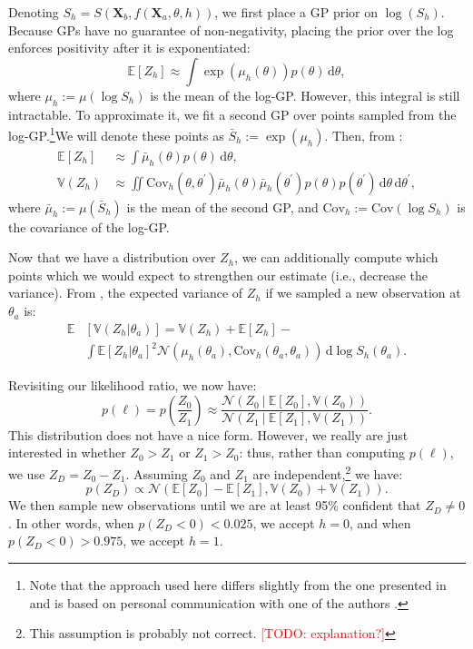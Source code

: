 \documentclass[10pt,letterpaper]{article}
\newcommand{\TODO}[1]{\textcolor{red}{[TODO: #1]}}
\newcommand{\Xa}[0]{\mathbf{X}_a}
\newcommand{\Xb}[0]{\mathbf{X}_b}
\newcommand{\dif}[0]{\,\mathrm{d}}
\begin{document}
Denoting $S_h=S(\Xb, f(\Xa, \theta, h))$, we first place a GP prior on
$\log(S_h)$. Because GPs have no guarantee of non-negativity, placing
the prior over the log enforces positivity after it is exponentiated:
\begin{equation}
\mathbb{E}[Z_h] \approx \int \exp(\mu_h(\theta))p(\theta)\dif\theta,
\end{equation}
where $\mu_h:=\mu(\log S_h)$ is the mean of the log-GP. However, this
integral is still intractable. To approximate it, we fit a second GP
over points sampled from the log-GP.\footnote{Note that the approach
  used here differs slightly from the one presented in
   and is based on personal communication with
  one of the authors \cite{Duvenaud:2013td}.}We will denote these
points as $\bar{S}_h:=\exp(\mu_h)$. Then, from
:
\begin{align}
  \mathbb{E}[Z_h] &\approx \int \bar{\mu}_h(\theta)p(\theta)\dif\theta,\\
  \mathbb{V}(Z_h) &\approx \iint \mathrm{Cov}_h(\theta,
  \theta^\prime)\bar{\mu}_h(\theta)\bar{\mu}_h(\theta^\prime)p(\theta)p(\theta^\prime)\dif\theta\dif\theta^\prime,
\end{align}
where $\bar{\mu}_h:=\mu(\bar{S}_h)$ is the mean of the second GP, and
$\mathrm{Cov}_h:=\mathrm{Cov}(\log S_h)$ is the covariance of the
log-GP.

Now that we have a distribution over $Z_h$, we can additionally
compute which points which we would expect to strengthen our estimate
(i.e., decrease the variance). From , the
expected variance of $Z_h$ if we sampled a new observation at
$\theta_a$ is:
\begin{align}
\mathbb{E}&[\mathbb{V}(Z_h|\theta_a)]=\mathbb{V}(Z_h) + \mathbb{E}[Z_h] - \\
&\int \mathbb{E}[Z_h|\theta_{a}]^2 \mathcal{N}(\mu_h(\theta_a), \mathrm{Cov}_h(\theta_a, \theta_a))\dif\log S_h(\theta_a).\nonumber
\label{ref:expected-variance}
\end{align}

Revisiting our likelihood ratio, we now have:
\begin{equation}
p(\ell)=p\left(\frac{Z_0}{Z_1}\right)\approx\frac{\mathcal{N}(Z_0\ \vert\ \mathbb{E}[Z_0], \mathbb{V}(Z_0))}{\mathcal{N}(Z_1\ \vert\ \mathbb{E}[Z_1], \mathbb{V}(Z_1))}.
\end{equation}
This distribution does not have a nice form. However, we really are
just interested in whether $Z_0>Z_1$ or $Z_1>Z_0$: thus, rather than
computing $p(\ell)$, we use $Z_D=Z_0-Z_1$. Assuming $Z_0$ and $Z_1$
are independent,\footnote{This assumption is probably not
  correct. \TODO{explanation?}} we have:
\begin{equation}
  p(Z_D)\propto\mathcal{N}(\mathbb{E}[Z_0] - \mathbb{E}[Z_1], \mathbb{V}(Z_0) + \mathbb{V}(Z_1)).
\end{equation}
We then sample new observations until we are at least 95\% confident
that $Z_D\neq 0$. In other words, when $p(Z_D<0)<0.025$, we accept
$h=0$, and when $p(Z_D<0)>0.975$, we accept $h=1$.
\end{document}
